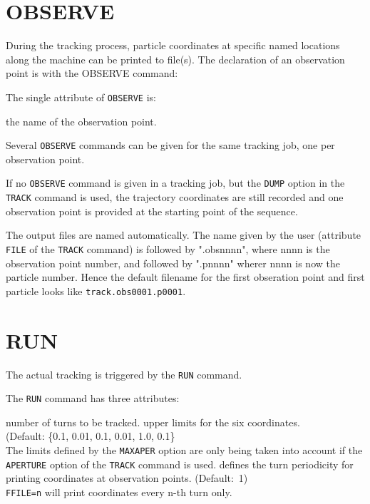 \section{OBSERVE}
\label{sec:observe}

During the tracking process, particle coordinates at specific named
locations along the machine can be printed to file(s). The declaration of
an observation point is with the OBSERVE command: 


The single attribute of {\tt OBSERVE} is:
\begin{madlist}
   the name of the observation point. 
\end{madlist}
  
Several {\tt OBSERVE} commands can be given for the same tracking
job, one per observation point. 

If no {\tt OBSERVE} command is given in a tracking job, but the
{\tt DUMP} option in the {\tt TRACK} command is used, the
trajectory coordinates are still recorded and one observation point is
provided at the starting point of the sequence. 
     
The output files are named automatically. The name given by
the user (attribute {\tt FILE} of the {\tt TRACK} command) is
followed by ".obsnnnn", where nnnn is the observation point number, and followed by 
".pnnnn"  wherer nnnn is now the particle number. Hence the default
filename for the first obseration point and first particle looks like
{\tt track.obs0001.p0001}.


\section{RUN}
\label{sec:run}

The actual tracking is triggered by the {\tt RUN} command.


The {\tt RUN} command has three attributes:

\begin{madlist}
   number of turns to be tracked.
   upper limits for the six coordinates.\\
  (Default: \{0.1, 0.01, 0.1, 0.01, 1.0, 0.1\} \\
  The limits defined by the {\tt MAXAPER} option are only being taken
  into account if the {\tt APERTURE} option of the {\tt TRACK}
  command is used.
   defines the turn periodicity for printing coordinates at
   observation points. (Default:~1)\\
   {\tt FFILE=n} will print coordinates every n-th turn only. 
\end{madlist}



